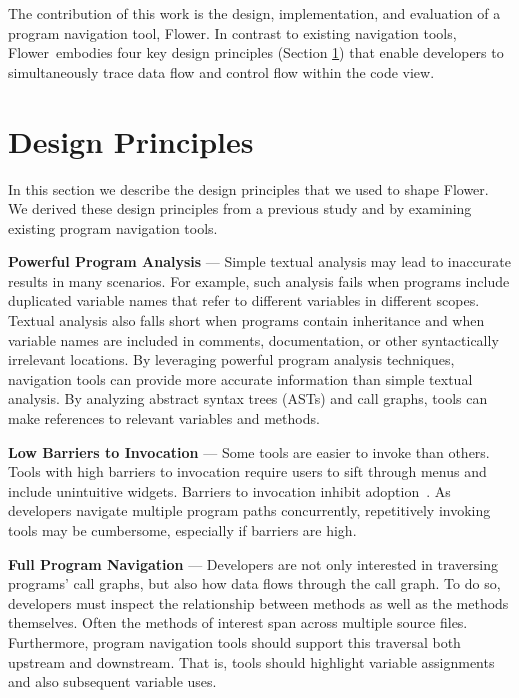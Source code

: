 \documentclass[conference]{IEEEtran}
\newcommand{\toolName}{Flower}
\begin{document}
The contribution of this work is the design, implementation, and evaluation of a program navigation tool, \toolName.
In contrast to existing navigation tools, \toolName~embodies four key design principles (Section \ref{DesignPrinciples}) that enable developers to simultaneously trace data flow and control flow within the code view. 


\section{Design Principles}
\label{DesignPrinciples}
In this section we describe the design principles that we used to shape \toolName. We derived these design principles from a previous study \cite{Smith2015} and by examining existing program navigation tools.
 
\vspace{1em} 
\noindent\textbf{Powerful Program Analysis} ---
Simple textual analysis may lead to inaccurate results in many scenarios. For example, such analysis fails when programs include duplicated variable names that refer to different variables in different scopes. Textual analysis also falls short when programs contain inheritance and when variable names are included in comments, documentation, or other syntactically irrelevant locations.
By leveraging powerful program analysis techniques, navigation tools can provide more accurate information than simple textual analysis.
By analyzing abstract syntax trees (ASTs) and call graphs, tools can make references to relevant variables and methods. 

\vspace{1em} 
\noindent\textbf{Low Barriers to Invocation} ---
Some tools are easier to invoke than others. 
Tools with high barriers to invocation require users to sift through menus and include unintuitive widgets. 
Barriers to invocation inhibit adoption~\cite{johnson2013don}.
As developers navigate multiple program paths concurrently, repetitively invoking tools may be cumbersome, especially if barriers are high. 


\vspace{1em} 
\noindent\textbf{Full Program Navigation}  ---
Developers are not only interested in traversing programs' call graphs, but also how data flows through the call graph.
To do so, developers must inspect the relationship between methods as well as the methods themselves.
Often the methods of interest span across multiple source files.
Furthermore, program navigation tools should support this traversal both upstream and downstream. 
That is, tools should highlight variable assignments and also subsequent variable uses. 
\end{document}

